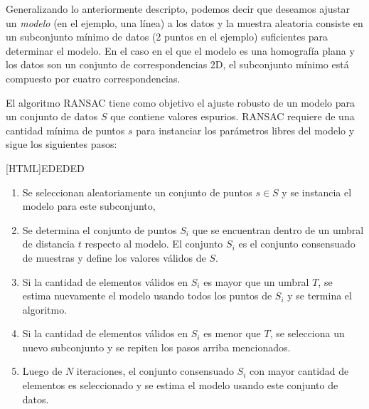 Generalizando lo anteriormente descripto, podemos decir que deseamos ajustar un \textit{modelo} (en el ejemplo, una línea) a los datos y la muestra aleatoria consiste en un subconjunto mínimo de datos (2 puntos en el ejemplo) suficientes para determinar el modelo. En el caso en el que el modelo es una homografía plana y los datos son un conjunto de correspondencias 2D, el subconjunto mínimo está compuesto por cuatro correspondencias.

El algoritmo RANSAC tiene como objetivo el ajuste robusto de un modelo para un conjunto de datos $S$ que contiene valores espurios. RANSAC requiere de una cantidad mínima de puntos $s$ para instanciar los parámetros libres del modelo y sigue los siguientes pasos:

[HTML]{EDEDED}{\parbox{365pt}{%
\noindent %
\begin{enumerate}[nolistsep]
 \item Se seleccionan aleatoriamente un conjunto de puntos $s \in S$ y se instancia el modelo para este subconjunto,
 \item Se determina el conjunto de puntos $S_i$ que se encuentran dentro de un umbral de distancia $t$ respecto al modelo. El conjunto $S_i$ es el conjunto consensuado de muestras y define los valores válidos de $S$.
 \item Si la cantidad de elementos válidos en $S_i$ es mayor que un umbral $T$, se estima nuevamente el modelo usando todos los puntos de $S_i$ y se termina el algoritmo.
 \item Si la cantidad de elementos válidos en $S_i$ es menor que $T$, se selecciona un nuevo subconjunto y se repiten los pasos arriba mencionados.
 \item Luego de $N$ iteraciones, el conjunto consensuado $S_i$ con mayor cantidad de elementos es seleccionado y se estima el modelo usando este conjunto de datos.
\end{enumerate}}}

